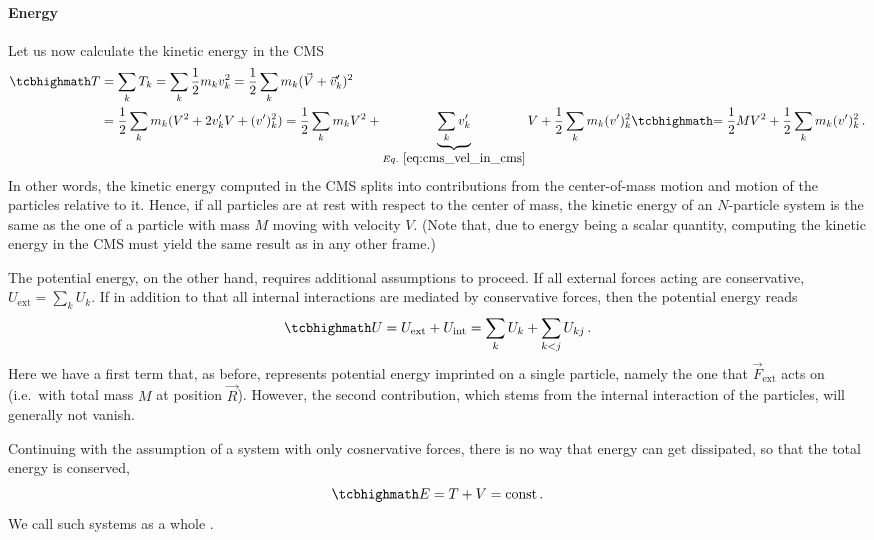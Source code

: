 \documentclass[../class_mech_main.tex]{subfiles}
\begin{document}
			\paragraph{Energy}
Let us now calculate the kinetic energy in the CMS
\begin{align}
	\eqbox{T} &= \sum_k T_k = \sum_k \frac{1}{2} m_k v_k^2 = \frac{1}{2} \sum_k m_k (\vec{V} + \vec{v}'_k)^2
	\notag\\
	&= \frac{1}{2} \sum_k m_k (V^2 + 2 v'_k V + (v')_k^2) = \frac{1}{2} \sum_k m_k V^2 + \underbrace{\sum_k v'_k}_{Eq.~\eqref{eq:cms_vel_in_cms}} V + \frac{1}{2} \sum_k m_k (v')_k^2 \eqbox{= \frac{1}{2} M V^2 + \frac{1}{2} \sum_k m_k (v')_k^2} \, .
\end{align}
In other words, the kinetic energy computed in the CMS splits into contributions from the center-of-mass motion and motion of the particles relative to it. Hence, if all particles are at rest with respect to the center of mass, the kinetic energy of an $N$-particle system is the same as the one of a particle with mass $M$ moving with velocity $V$.
(Note that, due to energy being a scalar quantity, computing the kinetic energy in the CMS must yield the same result as in any other frame.) 



The potential energy, on the other hand, requires additional assumptions to proceed. If all external forces acting are conservative, $U_\mathrm{ext} = \sum_k U_k$. If in addition to that all internal interactions are mediated by conservative forces, then the potential energy reads
\begin{equation}
	\eqbox{
		U = U_\mathrm{ext} + U_\mathrm{int} = \sum_k U_k + \sum_{k < j} U_{kj}
	} \, .
\end{equation}
Here we have a first term that, as before, represents potential energy imprinted on a single particle, namely the one that $\vec{F}_\mathrm{ext}$ acts on (i.e.~with total mass $M$ at position $\vec{R}$). However, the second contribution, which stems from the internal interaction of the particles, will generally not vanish.

Continuing with the assumption of a system with only cosnervative forces, there is no way that energy can get dissipated, so that the total energy is conserved,
\begin{equation}
	\eqbox{
		E = T + V = \text{const}
	} \, .
\end{equation}
We call such systems as a whole .
\end{document}
